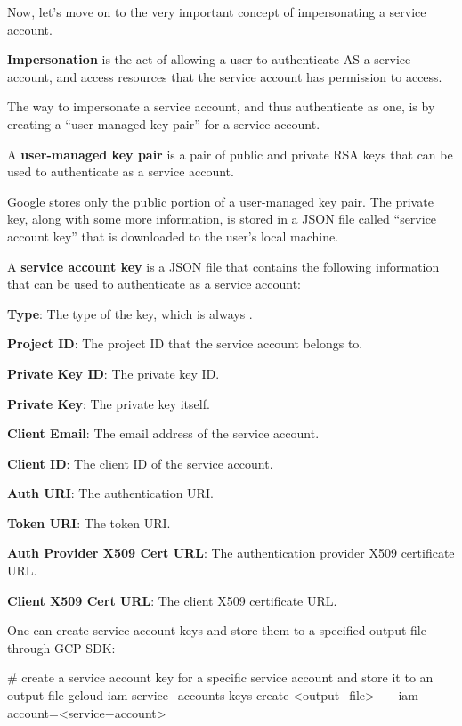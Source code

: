 Now, let's move on to the very important concept of impersonating a service account.

\bd[Impersonation]
\textbf{Impersonation} is the act of allowing a user to authenticate AS a service account, and access resources that the
service account has permission to access.
\ed

The way to impersonate a service account, and thus authenticate as one, is by creating a ``user-managed key pair'' for
a service account.

A \textbf{user-managed key pair} is a pair of public and private RSA keys that can be used to authenticate as a service
account.
\ed

Google stores only the public portion of a user-managed key pair. The private key, along with some more information,
is stored in a JSON file called ``service account key'' that is downloaded to the user's local machine.

A \textbf{service account key} is a JSON file that contains the following information that can be used to authenticate
as a service account:
\bit
\item \textbf{Type}: The type of the key, which is always .
\item \textbf{Project ID}: The project ID that the service account belongs to.
\item \textbf{Private Key ID}: The private key ID\@.
\item \textbf{Private Key}: The private key itself.
\item \textbf{Client Email}: The email address of the service account.
\item \textbf{Client ID}: The client ID of the service account.
\item \textbf{Auth URI}: The authentication URI\@.
\item \textbf{Token URI}: The token URI\@.
\item \textbf{Auth Provider X509 Cert URL}: The authentication provider X509 certificate URL\@.
\item \textbf{Client X509 Cert URL}: The client X509 certificate URL\@.
\eit
\ed

One can create service account keys and store them to a specified output file through GCP SDK:
\begin{bash}
# create a service account key for a specific service account and store it to an output file
gcloud iam service$-$accounts keys create <output$-$file> $-$$-$iam$-$account=<service$-$account>
\end{bash}


